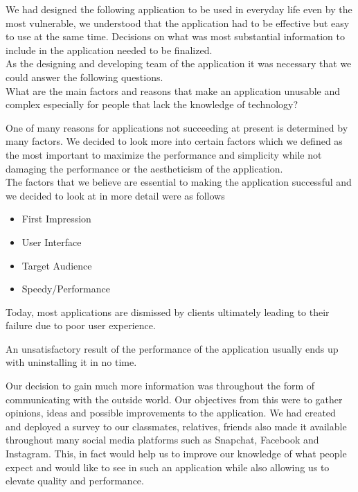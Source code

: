 \documentclass[a4paper,12pt]{report}
\begin{document}
We had designed the following application to be used in everyday life even by the most vulnerable, we understood that the application had to be effective but easy to use at the same time. Decisions on what was most substantial information to include in the application needed to be finalized.\\

As the designing and developing team of the application it was necessary that we could answer the following questions. \\

What are the main factors and reasons that make an application unusable and complex especially for people that lack the knowledge of technology?

One of many reasons for applications not succeeding at present is determined by many factors. We decided to look more into certain factors which we defined as the most important to maximize the performance and simplicity while not damaging the performance or the aestheticism of the application. 
\cite{DesignFailure}\\

The factors that we believe are essential to making the application successful and we decided to look at in more detail were as follows

\begin{itemize}
    \item First Impression
    \item User Interface
    \item Target Audience
    \item Speedy/Performance
\end{itemize}

Today, most applications are dismissed by clients ultimately leading to their failure due to poor user experience.

An unsatisfactory result of the performance of the application usually ends up with uninstalling it in no time. 
\cite{AppFailure}


Our decision to gain much more information was throughout the form of communicating with the outside world. Our objectives from this were to gather opinions, ideas and possible improvements to the application.
We had created and deployed a survey to our classmates, relatives, friends also made it available throughout many social media platforms such as Snapchat, Facebook and Instagram. 
This, in fact would help us to improve our knowledge of what people expect and would like to see in such an application while also allowing us to elevate quality and performance.\cite{surveyReasearch}
\end{document}
